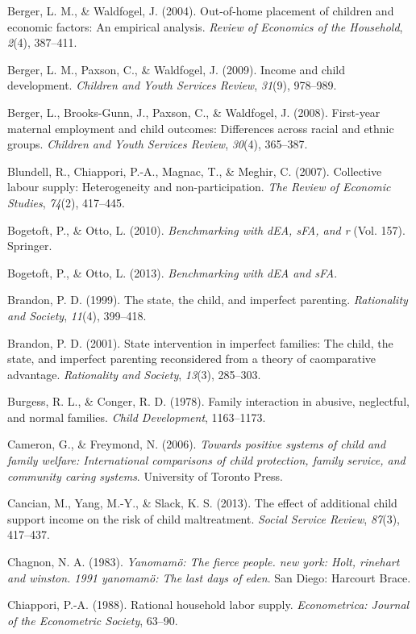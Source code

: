 \documentclass[review]{elsarticle}\usepackage[]{graphicx}\usepackage[]{color}
\begin{document}
Berger, L. M., \& Waldfogel, J. (2004). Out-of-home placement of
children and economic factors: An empirical analysis. \emph{Review of
Economics of the Household}, \emph{2}(4), 387--411.

Berger, L. M., Paxson, C., \& Waldfogel, J. (2009). Income and child
development. \emph{Children and Youth Services Review}, \emph{31}(9),
978--989.

Berger, L., Brooks-Gunn, J., Paxson, C., \& Waldfogel, J. (2008).
First-year maternal employment and child outcomes: Differences across
racial and ethnic groups. \emph{Children and Youth Services Review},
\emph{30}(4), 365--387.

Blundell, R., Chiappori, P.-A., Magnac, T., \& Meghir, C. (2007).
Collective labour supply: Heterogeneity and non-participation. \emph{The
Review of Economic Studies}, \emph{74}(2), 417--445.

Bogetoft, P., \& Otto, L. (2010). \emph{Benchmarking with dEA, sFA, and
r} (Vol. 157). Springer.

Bogetoft, P., \& Otto, L. (2013). \emph{Benchmarking with dEA and sFA}.

Brandon, P. D. (1999). The state, the child, and imperfect parenting.
\emph{Rationality and Society}, \emph{11}(4), 399--418.

Brandon, P. D. (2001). State intervention in imperfect families: The
child, the state, and imperfect parenting reconsidered from a theory of
caomparative advantage. \emph{Rationality and Society}, \emph{13}(3),
285--303.

Burgess, R. L., \& Conger, R. D. (1978). Family interaction in abusive,
neglectful, and normal families. \emph{Child Development}, 1163--1173.

Cameron, G., \& Freymond, N. (2006). \emph{Towards positive systems of
child and family welfare: International comparisons of child protection,
family service, and community caring systems}. University of Toronto
Press.

Cancian, M., Yang, M.-Y., \& Slack, K. S. (2013). The effect of
additional child support income on the risk of child maltreatment.
\emph{Social Service Review}, \emph{87}(3), 417--437.

Chagnon, N. A. (1983). \emph{Yanomamö: The fierce people. new york:
Holt, rinehart and winston. 1991 yanomamö: The last days of eden}. San
Diego: Harcourt Brace.

Chiappori, P.-A. (1988). Rational household labor supply.
\emph{Econometrica: Journal of the Econometric Society}, 63--90.
\end{document}
